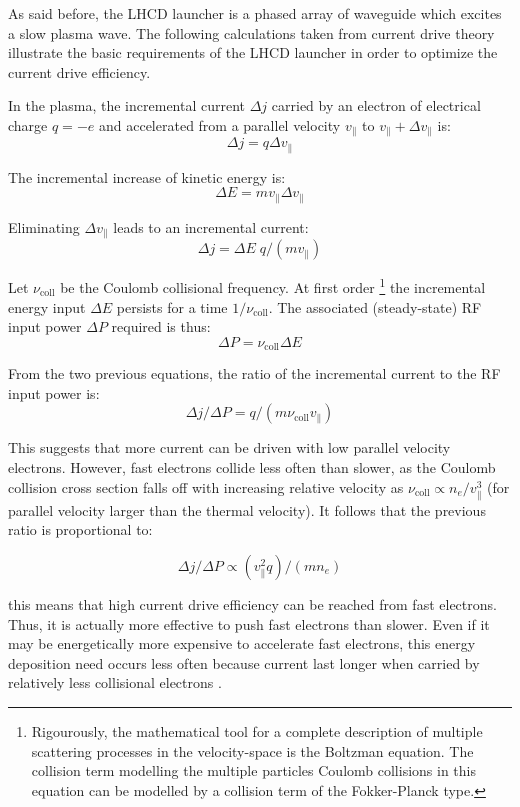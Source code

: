 As said before, the LHCD launcher is a phased array of waveguide which excites a slow plasma wave. The following calculations taken from current drive theory illustrate the basic requirements of the LHCD launcher in order to optimize the current drive efficiency. 

In the plasma, the incremental current $\Delta j$ carried by an electron of electrical charge $q=-e$ and accelerated from a parallel velocity $v_\parallel$ to $v_\parallel + \Delta v_\parallel$ is:
$$\Delta j = q \Delta v_{\parallel}$$

The incremental increase of kinetic energy is:
$$\Delta E = m v_{\parallel} \Delta v_{\parallel}$$

Eliminating $\Delta v_{\parallel}$ leads to an incremental current: 
$$\Delta j = \Delta E \; q/(m v_{\parallel})$$ 

Let $\nu_\mathrm{coll}$ be the Coulomb collisional frequency. At first order \footnote{Rigourously, the mathematical tool for a complete description of multiple scattering processes in the velocity-space is the Boltzman equation. The collision term modelling the multiple particles Coulomb collisions in this equation can be modelled by a collision term of the Fokker-Planck type.} the incremental energy input $\Delta E$ persists for a time $1/\nu_\mathrm{coll}$. The associated (steady-state) RF input power $\Delta P$ required is thus: 
$$\Delta P = \nu_\mathrm{coll} \Delta E$$ 

From the two previous equations, the ratio of the incremental current to the RF input power is:
$$\Delta j/ \Delta P = q / (m \nu_\mathrm{coll} v_{\parallel})$$

This suggests that more current can be driven with low parallel velocity electrons. However, fast electrons collide less often than slower, as the Coulomb collision cross section falls off with increasing relative velocity as $\nu_\mathrm{coll} \propto n_e/v_{\parallel}^3$ (for parallel velocity larger than the thermal velocity). It follows that the previous ratio is proportional to: 

$$\Delta j/ \Delta P \propto (v_{\parallel}^2 q) / (m n_e)$$

this means that high current drive efficiency can be reached from fast electrons. Thus, it is actually more effective to push fast electrons than slower. Even if it may be energetically more expensive to accelerate fast electrons, this energy deposition need occurs less often because current last longer when carried by relatively less collisional electrons . 

